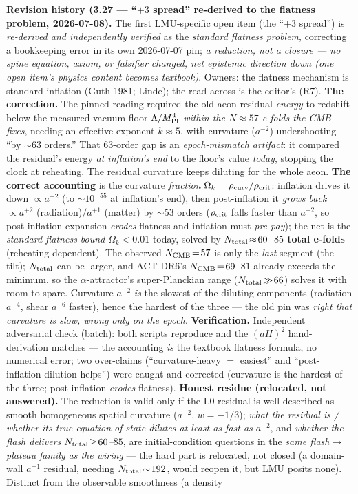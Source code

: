 \documentclass[11pt]{article}
\begin{document}
{\smallskip\noindent\textbf{Revision history (3.27 --- ``$+3$ spread'' re-derived to the flatness problem, 2026-07-08).} The first LMU-specific open item (the ``$+3$ spread'') is \emph{re-derived and independently verified} as the \emph{standard flatness problem}, correcting a bookkeeping error in its own 2026-07-07 pin; \emph{a reduction, not a closure --- no spine equation, axiom, or falsifier changed, net epistemic direction down (one open item's physics content becomes textbook)}. Owners: the flatness mechanism is standard inflation (Guth 1981; Linde); the read-across is the editor's (R7). \textbf{The correction.} The pinned reading required the old-aeon residual \emph{energy} to redshift below the measured vacuum floor $\Lambda/M_{\rm Pl}^4$ \emph{within the $N\!\approx\!57$ e-folds the CMB fixes}, needing an effective exponent $k\!\approx\!5$, with curvature ($a^{-2}$) undershooting ``by $\sim$63 orders.'' That $63$-order gap is an \emph{epoch-mismatch artifact}: it compared the residual's energy \emph{at inflation's end} to the floor's value \emph{today}, stopping the clock at reheating. The residual curvature keeps diluting for the whole aeon. \textbf{The correct accounting} is the curvature \emph{fraction} $\Omega_k=\rho_{\rm curv}/\rho_{\rm crit}$: inflation drives it down $\propto a^{-2}$ (to $\sim\!10^{-55}$ at inflation's end), then post-inflation it \emph{grows back} $\propto a^{+2}$ (radiation)$/a^{+1}$ (matter) by $\sim$53 orders ($\rho_{\rm crit}$ falls faster than $a^{-2}$, so post-inflation expansion \emph{erodes} flatness and inflation must \emph{pre-pay}); the net is the \emph{standard flatness bound} $\Omega_k\!<\!0.01$ today, solved by \textbf{$N_{\rm total}\!\approx\!60$--$85$ total e-folds} (reheating-dependent). The observed $N_{\rm CMB}\!=\!57$ is only the \emph{last} segment (the tilt); $N_{\rm total}$ can be larger, and ACT DR6's $N_{\rm CMB}\!=\!69$--$81$ already exceeds the minimum, so the $\alpha$-attractor's super-Planckian range ($N_{\rm total}\!\gg\!66$) solves it with room to spare. Curvature $a^{-2}$ \emph{is} the slowest of the diluting components (radiation $a^{-4}$, shear $a^{-6}$ faster), hence the hardest of the three --- the old pin was \emph{right that curvature is slow, wrong only on the epoch}. \textbf{Verification.} Independent adversarial check (batch): both scripts reproduce and the $(aH)^2$ hand-derivation matches --- the accounting \emph{is} the textbook flatness formula, no numerical error; two over-claims (``curvature-heavy $=$ easiest'' and ``post-inflation dilution helps'') were caught and corrected (curvature is the hardest of the three; post-inflation \emph{erodes} flatness). \textbf{Honest residue (relocated, not answered).} The reduction is valid only if the L0 residual is well-described as smooth homogeneous spatial curvature ($a^{-2}$, $w{=}{-}1/3$); \emph{what the residual is / whether its true equation of state dilutes at least as fast as $a^{-2}$}, and \emph{whether the flash delivers $N_{\rm total}\!\ge\!60$--$85$}, are initial-condition questions in the \emph{same flash$\to$plateau family as the wiring} --- the hard part is relocated, not closed (a domain-wall $a^{-1}$ residual, needing $N_{\rm total}\!\sim\!192$, would reopen it, but LMU posits none). Distinct from the observable smoothness (a density }
\end{document}
